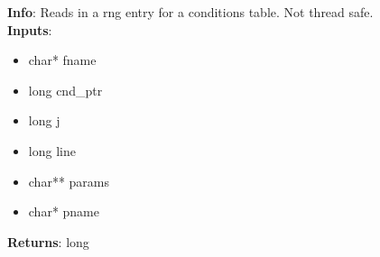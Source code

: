 \textbf{Info}: Reads in a rng entry for a conditions table. Not thread safe.\\

\noindent \textbf{Inputs}:
\begin{itemize}
\item{char* fname}
\item{long cnd\_ptr}
\item{long j}
\item{long line}
\item{char** params}
\item{char* pname}
\end{itemize}

\noindent \textbf{Returns}: long
